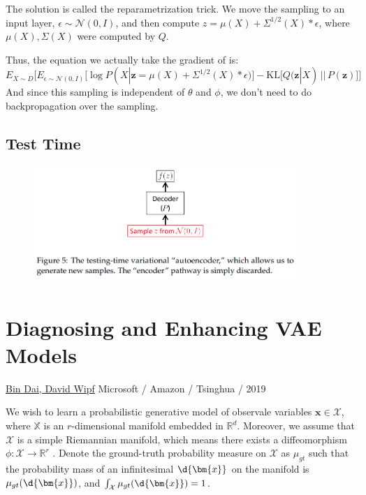 \documentclass{article}
\begin{document}
  The solution is called the reparametrization trick. We move the sampling to an input layer, $\epsilon \sim  \mathcal{N}(0, I)$, and then compute $z = \mu(X) + \Sigma^{1/2} (X) * \epsilon$, where $\mu(X), \Sigma(X)$ were computed by $Q$. 

Thus, the equation we actually take the gradient of is:
\[
  E_{X \sim  D} \Big[  E_{\epsilon \sim  \mathcal{N}(0,I)} \big[ \log P(X| \bm{z} = \mu(X) + \Sigma^{1/2} (X) * \epsilon) \big] - \mathrm{KL} \big[ Q(\bm{z} | X) \,||\, P(\bm{z}) \big] \Big] 
\]
And since this sampling is independent of $\theta$ and $\phi$, we don't need to do backpropagation over the sampling. 

\subsection{Test Time}
\begin{figure}[H] \centering \includegraphics[height=0.3\textheight,width=0.9\textwidth,keepaspectratio]{DoreschTestTime}  \label{fig:DoreschTestTime} \end{figure}



\newpage
\section{Diagnosing and Enhancing VAE Models}
\ul{Bin Dai, David Wipf} Microsoft / Amazon / Tsinghua / 2019

We wish to learn a probabilistic generative model of observale variables $\bm{x} \in \mathcal{X}$, where $\mathbb{X}$ is an $r$-dimensional manifold embedded in $\mathbb{R}^{d}$. Moreover, we assume that $\mathcal{X}$  is a simple Riemannian manifold, which means there exists a diffeomorphism $\phi : \mathcal{X} \to \mathbb{R}^{r}$ . Denote the ground-truth probability measure on $\mathcal{X}$ as $\mu_{gt}$ such that the probability mass of an infinitesimal $\d{\bm{x}}$ on the manifold is $\mu_{gt}(\d{\bm{x}})$, and $\int_{\mathcal{X}} \mu_{gt} (\d{\bm{x}})  = 1$.
\end{document}
